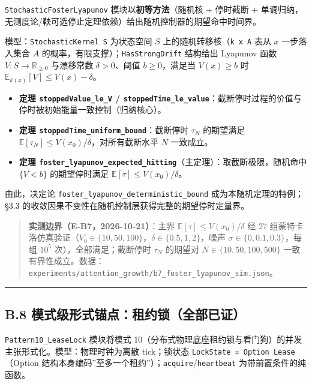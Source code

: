 \texttt{StochasticFosterLyapunov} 模块以\textbf{初等方法}（随机核 +
停时截断 +
单调归纳，无测度论/鞅可选停止定理依赖）给出随机控制器的期望命中时间界。

模型：\texttt{StochasticKernel\ S} 为状态空间 \(S\)
上的随机转移核（\texttt{k\ x\ A} 表从 \(x\) 一步落入集合 \(A\)
的概率，有限支撑）；\texttt{HasStrongDrift} 结构给出 Lyapunov 函数
\(V:S\to\mathbb{R}_{\ge0}\) 与漂移常数 \(\delta>0\)、阈值
\(b\ge0\)，满足当 \(V(x)\ge b\) 时
\(\mathbb{E}_{k(x)}[V] \le V(x)-\delta\)。

\begin{itemize}
\tightlist
\item
  \textbf{定理 \texttt{stoppedValue\_le\_V} /
  \texttt{stoppedTime\_le\_value}}：截断停时过程的价值与停时被初始能量一致控制（归纳核心）。
\item
  \textbf{定理 \texttt{stoppedTime\_uniform\_bound}}：截断停时
  \(\tau_N\) 的期望满足
  \(\mathbb{E}[\tau_N] \le V(x_0)/\delta\)，对所有截断水平 \(N\)
  一致成立。
\item
  \textbf{定理
  \texttt{foster\_lyapunov\_expected\_hitting}}（主定理）：取截断极限，随机命中
  \(\{V<b\}\) 的期望停时满足 \(\mathbb{E}[\tau] \le V(x_0)/\delta\)。
\end{itemize}

由此，决定论 \texttt{foster\_lyapunov\_deterministic\_bound}
成为本随机定理的特例；§3.3
的收敛因果不变性在随机控制层获得完整的期望停时定量界。

\begin{quote}
\textbf{实测边界（E-B7，2026-10-21）}：主界
\(\mathbb{E}[\tau] \le V(x_0)/\delta\) 经 27
组蒙特卡洛仿真验证（\(V_0 \in \{10,50,100\}\)，\(\delta \in \{0.5,1,2\}\)，噪声
\(\sigma \in \{0,0.1,0.3\}\)，每组 \(10^5\) 次），全部满足；截断停时
\(\tau_N\) 的期望对 \(N \in \{10,50,100,500\}\)
一致有界性成立。数据：\texttt{experiments/attention\_growth/b7\_foster\_lyapunov\_sim.json}。
\end{quote}

\begin{center}\rule{0.5\linewidth}{0.5pt}\end{center}

\subsection{B.8
模式级形式锚点：租约锁（全部已证）}\label{b.8-ux6a21ux5f0fux7ea7ux5f62ux5f0fux951aux70b9ux79dfux7ea6ux9501ux5168ux90e8ux5df2ux8bc1}

\texttt{Pattern10\_LeaseLock} 模块将模式
10（分布式物理底座租约锁与看门狗）的并发主张形式化。模型：物理时钟为离散
tick；锁状态 \texttt{LockState\ =\ Option\ Lease}（Option
结构本身编码''至多一个租约''）；\texttt{acquire}/\texttt{heartbeat}
为带前置条件的纯函数。

